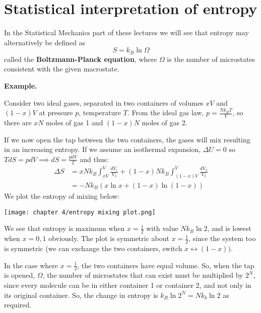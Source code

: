 \documentclass[a4paper,11pt,oneside]{book}
\begin{document}
\section{Statistical interpretation of entropy}
In the Statistical Mechanics part of these lectures we will see that entropy may alternatively be defined as
\begin{equation}
    \boxed{S= k_B \ln \Omega}
\end{equation}
called the \textbf{Boltzmann-Planck equation}, where $\Omega$ is the number of microstates consistent with the given macrostate.

\begin{strategy}
\textbf{Example.}
\end{strategy}
\begin{mdframed}
Consider two ideal gases, separated in two containers of volumes $xV$ and $(1-x)V$ at pressure $p$, temperature $T$. From the ideal gas law, $p=\frac{Nk_B T}{V}$, so there are $xN$ moles of gas 1 and $(1-x)N$ moles of gas 2. 

If we now open the tap between the two containers, the gases will mix resulting in an increasing entropy. If we assume an isothermal expansion, $\Delta U = 0$ so $T dS = p dV \implies dS = \frac{p dV}{T}$ and thus:
\begin{align}
    \Delta S &= x N k_B \int_{xV}^V \frac{dV_1}{V_1} + (1-x) N k_B \int_{(1-x)V}^V \frac{dV_2}{V_2}\\
             &= -Nk_B(x\ln x + (1-x)\ln (1-x))
\end{align}
We plot the entropy of mixing below:
\begin{center}
\begin{minipage}[h!]{6cm}
    \centering
        \texttt{[image: chapter 4/entropy mixing plot.png]}
    \end{minipage}
\end{center}

We see that entropy is maximum when $x=\frac{1}{2}$ with value $Nk_B \ln 2$, and is lowest when $x=0,1$ obviously. The plot is symmetric about $x=\frac{1}{2}$, since the system too is symmetric (we can exchange the two containers, switch $x \leftrightarrow (1-x))$. 


In the case where $x=\frac{1}{2}$, the two containers have equal volume. So, when the tap is opened, $\Omega$, the number of microstates that can exist must be multiplied by $2^N$, since every molecule can be in either container 1 or container 2, and not only in its original container. So, the change in entropy is $k_B \ln 2^N = N k_b \ln 2$ as required. 
\end{mdframed}
\end{document}
